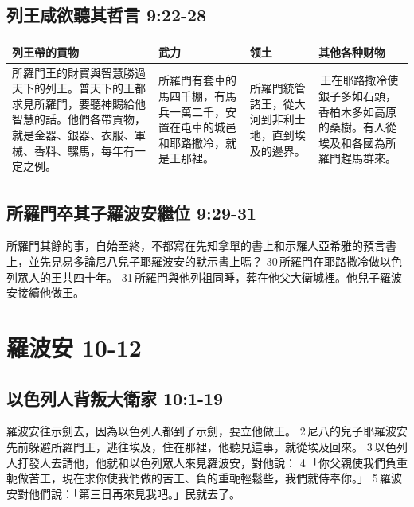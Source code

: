 \subsection{列王咸欲聽其哲言 9:22-28}
\begin{table}[H]
\centering 
\begin{tabular}{p{6.75cm}|p{3.5cm}|p{2.5cm}|p{3.75cm}}\hline\hline
列王帶的貢物&武力&领土&其他各种财物\\\hline\hline
所羅門王的財寶與智慧勝過天下的列王。普天下的王都求見所羅門，要聽神賜給他智慧的話。他們各帶貢物，就是金器、銀器、衣服、軍械、香料、騾馬，每年有一定之例。
&所羅門有套車的馬四千棚，有馬兵一萬二千，安置在屯車的城邑和耶路撒冷，就是王那裡。 
&所羅門統管諸王，從大河到非利士地，直到埃及的邊界。
& 王在耶路撒冷使銀子多如石頭，香柏木多如高原的桑樹。有人從埃及和各國為所羅門趕馬群來。\\\hline
\end{tabular}
\end{table}


\subsection{所羅門卒其子羅波安繼位 9:29-31 }
所羅門其餘的事，自始至終，不都寫在先知拿單的書上和示羅人亞希雅的預言書上，並先見易多論尼八兒子耶羅波安的默示書上嗎？ 30 所羅門在耶路撒冷做以色列眾人的王共四十年。 31 所羅門與他列祖同睡，葬在他父大衛城裡。他兒子羅波安接續他做王。


\section{羅波安 10-12 }
\subsection{以色列人背叛大衛家 10:1-19}
羅波安往示劍去，因為以色列人都到了示劍，要立他做王。 2 尼八的兒子耶羅波安先前躲避所羅門王，逃往埃及，住在那裡，他聽見這事，就從埃及回來。 3 以色列人打發人去請他，他就和以色列眾人來見羅波安，對他說： 4 「你父親使我們負重軛做苦工，現在求你使我們做的苦工、負的重軛輕鬆些，我們就侍奉你。」 5 羅波安對他們說：「第三日再來見我吧。」民就去了。

